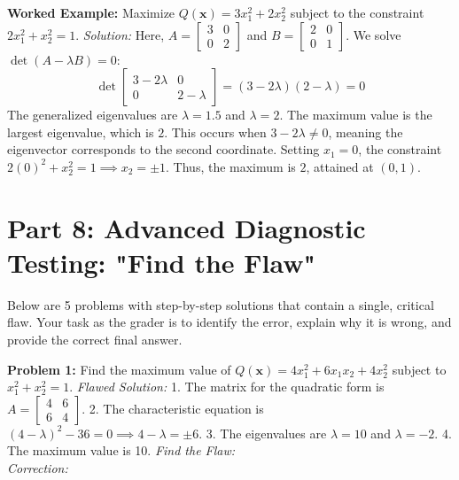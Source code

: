 \documentclass[11pt, letterpaper]{article}
\theoremstyle{definition}
\theoremstyle{remark}
\begin{document}
\textbf{Worked Example:}
Maximize $Q(\mathbf{x}) = 3x_1^2 + 2x_2^2$ subject to the constraint $2x_1^2 + x_2^2 = 1$.
\textit{Solution:}
Here, $A = \begin{bmatrix} 3 & 0 \\ 0 & 2 \end{bmatrix}$ and $B = \begin{bmatrix} 2 & 0 \\ 0 & 1 \end{bmatrix}$.
We solve $\det(A - \lambda B) = 0$:
\[ \det \begin{bmatrix} 3 - 2\lambda & 0 \\ 0 & 2 - \lambda \end{bmatrix} = (3 - 2\lambda)(2 - \lambda) = 0 \]
The generalized eigenvalues are $\lambda = 1.5$ and $\lambda = 2$.
The maximum value is the largest eigenvalue, which is $2$. This occurs when $3 - 2\lambda \neq 0$, meaning the eigenvector corresponds to the second coordinate. Setting $x_1 = 0$, the constraint $2(0)^2 + x_2^2 = 1 \implies x_2 = \pm 1$. Thus, the maximum is $2$, attained at $(0, 1)$.

\newpage

\section{Part 8: Advanced Diagnostic Testing: "Find the Flaw"}

Below are 5 problems with step-by-step solutions that contain a single, critical flaw. Your task as the grader is to identify the error, explain why it is wrong, and provide the correct final answer.

\vspace{1em}
\textbf{Problem 1:} Find the maximum value of $Q(\mathbf{x}) = 4x_1^2 + 6x_1x_2 + 4x_2^2$ subject to $x_1^2 + x_2^2 = 1$.
\textit{Flawed Solution:}
1. The matrix for the quadratic form is $A = \begin{bmatrix} 4 & 6 \\ 6 & 4 \end{bmatrix}$.
2. The characteristic equation is $(4-\lambda)^2 - 36 = 0 \implies 4-\lambda = \pm 6$.
3. The eigenvalues are $\lambda = 10$ and $\lambda = -2$.
4. The maximum value is 10.
\textit{Find the Flaw:} \hrulefill \\
\textit{Correction:} \hrulefill
\end{document}
